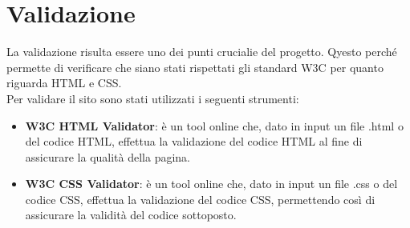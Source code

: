 \section{Validazione}
La validazione risulta essere uno dei punti crucialie del progetto. Qyesto perché permette di verificare che siano stati rispettati gli standard W3C per quanto riguarda HTML e CSS.\\
Per validare il sito sono stati utilizzati i seguenti strumenti:
\begin{itemize}
	\item \textbf{W3C HTML Validator}: è un tool online che, dato in input un file .html o del codice HTML, effettua la validazione del codice HTML al fine di assicurare la qualità della pagina.
	\item \textbf{W3C CSS Validator}: è un tool online che, dato in input un file .css o del codice CSS, effettua la validazione del codice CSS, permettendo così di assicurare la validità del codice sottoposto.
\end{itemize}